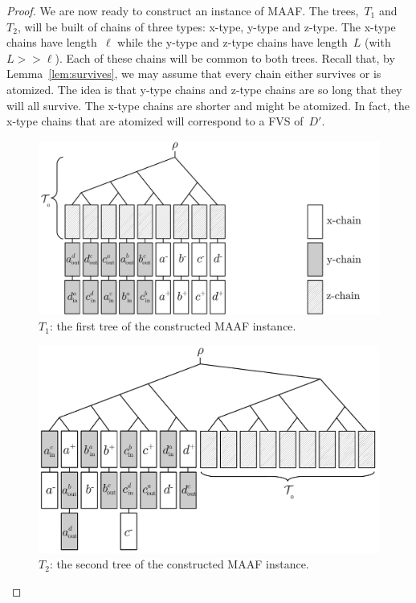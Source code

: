 \begin{proof}
We are now ready to construct an instance of {\sc MAAF}. The trees,~$T_1$ and~$T_2$, will be built of chains of three types: x-type, y-type and z-type. The x-type chains have length~$\ell$ while the y-type and z-type chains have length~$L$ (with $L>>\ell$). Each of these chains will be common to both trees. Recall that,
by Lemma~\ref{lem:survives}, we may assume that every chain either survives or is atomized. The idea is that y-type chains and z-type chains are so long that they will all survive. The x-type chains are shorter and might be atomized. In fact, the x-type chains that are atomized will correspond to a FVS of~$D'$.

\begin{figure}
    \centering
    \includegraphics[scale=.5]{../figs/fig_reduction2}
    \caption{$T_1$: the first tree of the constructed MAAF instance.}
    \label{fig:reduction2}
\end{figure}

\begin{figure}
    \centering
    \includegraphics[scale=.5]{../figs/fig_reduction3}
    \caption{$T_2$: the second tree of the constructed MAAF instance.}
    \label{fig:reduction3}
\end{figure}


\end{proof}
